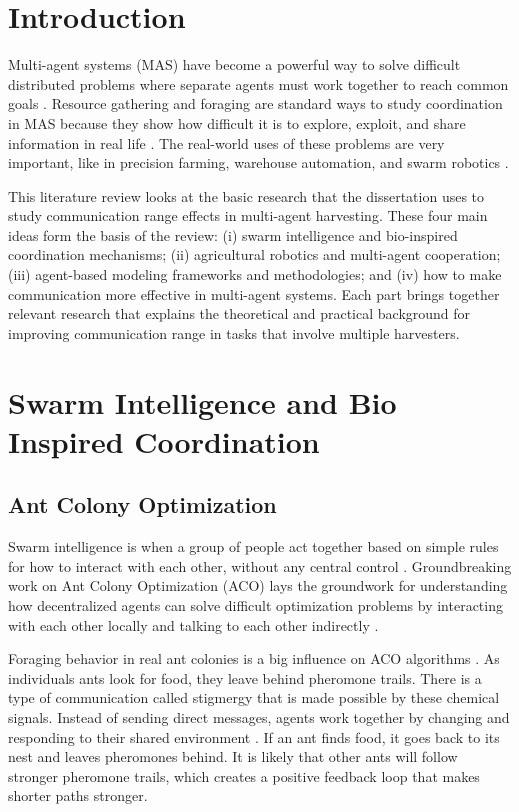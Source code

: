 
\section{Introduction}

Multi-agent systems (MAS) have become a powerful way to solve difficult distributed problems where separate agents must work together to reach common goals \citep{wooldridge2009introduction, shoham2008multiagent}. Resource gathering and foraging are standard ways to study coordination in MAS because they show how difficult it is to explore, exploit, and share information in real life \citep{zedadra2017, liu2007modeling}. The real-world uses of these problems are very important, like in precision farming, warehouse automation, and swarm robotics \citep{brambilla2013swarm, bechar2016agricultural}.

This literature review looks at the basic research that the dissertation uses to study communication range effects in multi-agent harvesting. These four main ideas form the basis of the review: (i) swarm intelligence and bio-inspired coordination mechanisms; (ii) agricultural robotics and multi-agent cooperation; (iii) agent-based modeling frameworks and methodologies; and (iv) how to make communication more effective in multi-agent systems. Each part brings together relevant research that explains the theoretical and practical background for improving communication range in tasks that involve multiple harvesters.

\section{Swarm Intelligence and Bio Inspired Coordination}

\subsection{Ant Colony Optimization}

Swarm intelligence is when a group of people act together based on simple rules for how to interact with each other, without any central control \citep{sahin2004swarm, brambilla2013swarm}. Groundbreaking work on Ant Colony Optimization (ACO) lays the groundwork for understanding how decentralized agents can solve difficult optimization problems by interacting with each other locally and talking to each other indirectly \citep{dorigo2004ant}.

Foraging behavior in real ant colonies is a big influence on ACO algorithms \citep{duan2023}. As individuals ants look for food, they leave behind pheromone trails. There is a type of communication called stigmergy that is made possible by these chemical signals. Instead of sending direct messages, agents work together by changing and responding to their shared environment \citep{werger1999cooperation}. If an ant finds food, it goes back to its nest and leaves pheromones behind. It is likely that other ants will follow stronger pheromone trails, which creates a positive feedback loop that makes shorter paths stronger.



